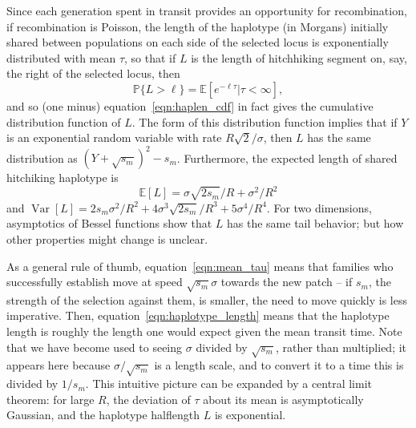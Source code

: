 \documentclass{article}
\DeclareMathOperator{\var}{Var}
\renewcommand{\P}{\mathbb{P}}
\newcommand{\E}{\mathbb{E}}
\begin{document}
Since each generation spent in transit provides an opportunity for recombination,
if recombination is Poisson, the length of the haplotype (in Morgans)
initially shared between populations on each side of the selected locus is exponentially distributed
with mean $\tau$, so that if $L$ is the length of hitchhiking segment on, say, the right of
the selected locus, then
\begin{equation} \label{eqn:haplen_cdf2}
\P\{L>\ell\} = \E[e^{-\ell \tau}|\tau<\infty] ,
\end{equation}
and so (one minus) equation~\eqref{eqn:haplen_cdf} in fact gives the cumulative distribution function of $L$.
The form of this distribution function implies that if $Y$ is an exponential random variable with rate $R\sqrt{2}/\sigma$,
then $L$ has the same distribution as $(Y + \sqrt{s_m})^2 - s_m$.
Furthermore, the expected length of shared hitchiking haplotype is
\begin{equation} \label{eqn:haplotype_length}
\E[L] = \sigma \sqrt{2s_m}/R + \sigma^2/R^2
\end{equation}
and $\var[L] = 2s_m\sigma^2/R^2 + 4 \sigma^3 \sqrt{2s_m}/R^3 + 5 \sigma^4 / R^4$.
For two dimensions, asymptotics of Bessel functions show that $L$ has the same tail behavior;
but how other properties might change is unclear. 

As a general rule of thumb, equation~\eqref{eqn:mean_tau} means that families who successfully establish
move at speed $\sqrt{s_m} \sigma$ towards the new patch 
-- if $s_m$, the strength of the selection against them, is smaller, the need to move quickly is less imperative.
Then, equation~\eqref{eqn:haplotype_length} means that the haplotype length
is roughly the length one would expect given the mean transit time.
Note that we have become used to seeing $\sigma$ divided by $\sqrt{s_m}$, rather than multiplied;
it appears here because $\sigma/\sqrt{s_m}$ is a length scale, 
and to convert it to a time this is divided by $1/s_m$.
This intuitive picture can be expanded by a central limit theorem:
for large $R$, the deviation of $\tau$ about its mean is asymptotically Gaussian,
and the haplotype halflength $L$ is exponential.

\end{document}
